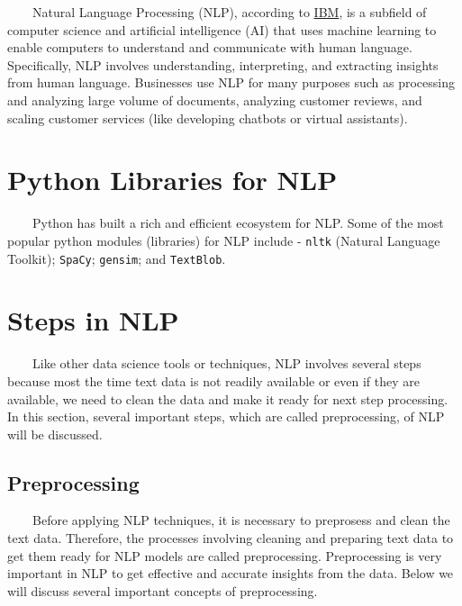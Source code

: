 \documentclass[
  letterpaper,
  DIV=11,
  numbers=noendperiod]{scrreprt}
\begin{document}
~~~~Natural Language Processing (NLP), according to
\href{https://www.ibm.com/topics/natural-language-processing}{IBM}, is a
subfield of computer science and artificial intelligence (AI) that uses
machine learning to enable computers to understand and communicate with
human language. Specifically, NLP involves understanding, interpreting,
and extracting insights from human language. Businesses use NLP for many
purposes such as processing and analyzing large volume of documents,
analyzing customer reviews, and scaling customer services (like
developing chatbots or virtual assistants).

\section{Python Libraries for NLP}\label{python-libraries-for-nlp}

~~~~Python has built a rich and efficient ecosystem for NLP. Some of the
most popular python modules (libraries) for NLP include - \texttt{nltk}
(Natural Language Toolkit); \texttt{SpaCy}; \texttt{gensim}; and
\texttt{TextBlob}.

\section{Steps in NLP}\label{steps-in-nlp}

~~~~Like other data science tools or techniques, NLP involves several
steps because most the time text data is not readily available or even
if they are available, we need to clean the data and make it ready for
next step processing. In this section, several important steps, which
are called preprocessing, of NLP will be discussed.

\subsection{Preprocessing}\label{sec-preprocessing}

~~~~Before applying NLP techniques, it is necessary to preprosess and
clean the text data. Therefore, the processes involving cleaning and
preparing text data to get them ready for NLP models are called
preprocessing. Preprocessing is very important in NLP to get effective
and accurate insights from the data. Below we will discuss several
important concepts of preprocessing.
\end{document}
